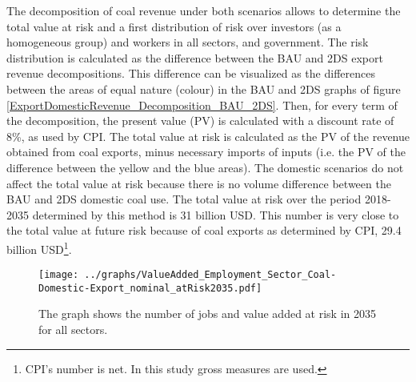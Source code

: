 \documentclass[12pt,english]{article}
\begin{document}
The decomposition of coal revenue under both scenarios allows to determine the total value at risk and a first distribution of risk over investors (as a homogeneous group) and workers in all sectors, and government. The risk distribution is calculated as the difference between the BAU and 2DS export revenue decompositions. This difference can be visualized as the differences between the areas of equal nature (colour) in the BAU and 2DS graphs of figure \ref{ExportDomesticRevenue_Decomposition_BAU_2DS}. Then, for every term of the decomposition, the present value (PV) is calculated with a discount rate of 8\%, as used by CPI. The total value at risk is calculated as the PV of the revenue obtained from coal exports, minus necessary imports of inputs (i.e. the PV of the difference between the yellow and the blue areas). The domestic scenarios do not affect the total value at risk because there is no volume difference between the BAU and 2DS domestic coal use. The total value at risk over the period 2018-2035 determined by this method is 31 billion USD. This number is very close to the total value at future risk because of coal exports as determined by CPI, 29.4 billion USD\footnote{CPI's number is net. In this study gross measures are used.}.

\begin{figure}[!t]
	\centering
	\hspace{-10pt}\texttt{[image: ../graphs/ValueAdded\_Employment\_Sector\_Coal-Domestic-Export\_nominal\_atRisk2035.pdf]}
	\caption{\label{ValueAdded_Employment_Sector_Coal-Export_BAU_2DS}\small The graph shows the number of jobs and value added at risk in 2035 for all sectors.}
\end{figure}
\end{document}
